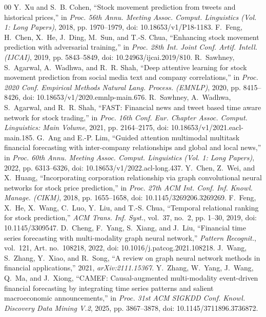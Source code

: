 \documentclass[conference]{IEEEtran}
\begin{document}
\begin{thebibliography}{00}
 Y.~Xu and S.~B. Cohen, ``Stock movement prediction from tweets and historical prices,'' in \emph{Proc. 56th Annu. Meeting Assoc. Comput. Linguistics (Vol. 1: Long Papers)}, 2018, pp. 1970--1979, doi: 10.18653/v1/P18-1183.
 F.~Feng, H.~Chen, X.~He, J.~Ding, M.~Sun, and T.-S. Chua, ``Enhancing stock movement prediction with adversarial training,'' in \emph{Proc. 28th Int. Joint Conf. Artif. Intell. (IJCAI)}, 2019, pp. 5843--5849, doi: 10.24963/ijcai.2019/810.
 R.~Sawhney, S.~Agarwal, A.~Wadhwa, and R.~R. Shah, ``Deep attentive learning for stock movement prediction from social media text and company correlations,'' in \emph{Proc. 2020 Conf. Empirical Methods Natural Lang. Process. (EMNLP)}, 2020, pp. 8415--8426, doi: 10.18653/v1/2020.emnlp-main.676.
 R.~Sawhney, A.~Wadhwa, S.~Agarwal, and R.~R. Shah, ``FAST: Financial news and tweet based time aware network for stock trading,'' in \emph{Proc. 16th Conf. Eur. Chapter Assoc. Comput. Linguistics: Main Volume}, 2021, pp. 2164--2175, doi: 10.18653/v1/2021.eacl-main.185.
 G.~Ang and E.-P. Lim, ``Guided attention multimodal multitask financial forecasting with inter-company relationships and global and local news,'' in \emph{Proc. 60th Annu. Meeting Assoc. Comput. Linguistics (Vol. 1: Long Papers)}, 2022, pp. 6313--6326, doi: 10.18653/v1/2022.acl-long.437.
 Y.~Chen, Z.~Wei, and X.~Huang, ``Incorporating corporation relationship via graph convolutional neural networks for stock price prediction,'' in \emph{Proc. 27th ACM Int. Conf. Inf. Knowl. Manage. (CIKM)}, 2018, pp. 1655--1658, doi: 10.1145/3269206.3269269.
 F.~Feng, X.~He, X.~Wang, C.~Luo, Y.~Liu, and T.-S. Chua, ``Temporal relational ranking for stock prediction,'' \emph{ACM Trans. Inf. Syst.}, vol.~37, no.~2, pp. 1--30, 2019, doi: 10.1145/3309547.
 D.~Cheng, F.~Yang, S.~Xiang, and J.~Liu, ``Financial time series forecasting with multi-modality graph neural network,'' \emph{Pattern Recognit.}, vol.~121, Art. no.~108218, 2022, doi: 10.1016/j.patcog.2021.108218.
 J.~Wang, S.~Zhang, Y.~Xiao, and R.~Song, ``A review on graph neural network methods in financial applications,'' 2021, \emph{arXiv:2111.15367}.
 Y.~Zhang, W.~Yang, J.~Wang, Q.~Ma, and J.~Xiong, ``CAMEF: Causal-augmented multi-modality event-driven financial forecasting by integrating time series patterns and salient macroeconomic announcements,'' in \emph{Proc. 31st ACM SIGKDD Conf. Knowl. Discovery Data Mining V.2}, 2025, pp. 3867--3878, doi: 10.1145/3711896.3736872.

\end{thebibliography}
\end{document}
